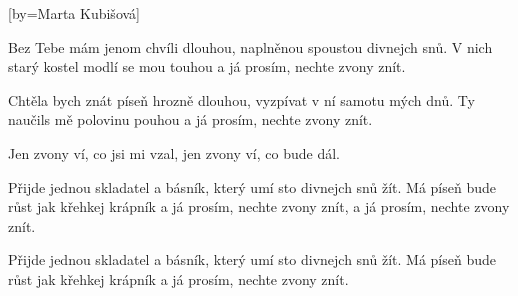 [by={Marta Kubišová}]

\beginverse{}
Bez Tebe mám jenom chvíli dlouhou,
naplněnou spoustou divnejch snů.
V nich starý kostel modlí se mou touhou
a já prosím, nechte zvony znít. 
\endverse{}

\beginverse{}
Chtěla bych znát píseň hrozně dlouhou,
vyzpívat v ní samotu mých dnů.
Ty naučils mě polovinu pouhou
a já prosím, nechte zvony znít. 
\endverse{}

\beginchorus{}
Jen zvony ví, co jsi mi vzal, 
jen zvony ví, co bude dál.  
\endchorus{}

\beginverse{}
Přijde jednou skladatel a básník,
který umí sto divnejch snů žít.
Má píseň bude růst jak křehkej krápník
a já prosím, nechte zvony znít, 
a já prosím, nechte zvony znít. 
\endverse{}

\beginchorus{}
\phantom{}
\endchorus{}

\beginverse{}
Přijde jednou skladatel a básník,
který umí sto divnejch snů žít.
Má píseň bude růst jak křehkej krápník
\lrep{} a já prosím, nechte zvony znít.  \rrep{}
\endverse{}

\endsong{}
